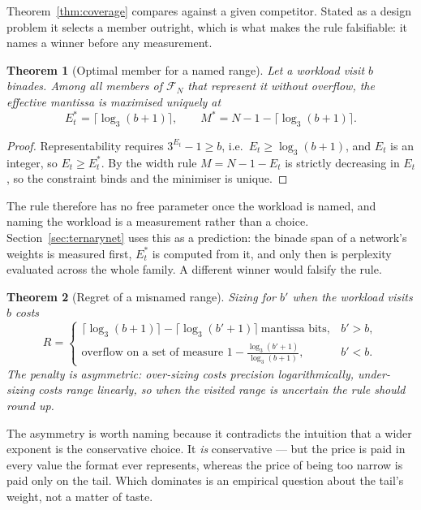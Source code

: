 \documentclass[11pt]{article}
\newtheorem{theorem}{Theorem}
\theoremstyle{definition}
\begin{document}
Theorem~\ref{thm:coverage} compares against a given competitor. Stated as a
design problem it selects a member outright, which is what makes the rule
falsifiable: it names a winner before any measurement.

\begin{theorem}[Optimal member for a named range]
\label{thm:optimal}
Let a workload visit $b$ binades. Among all members of $\mathcal{F}_N$ that
represent it without overflow, the effective mantissa is maximised uniquely at
\[
  E_t^{*} = \bigl\lceil \log_3 (b+1) \bigr\rceil,
  \qquad
  M^{*} = N - 1 - \bigl\lceil \log_3 (b+1) \bigr\rceil .
\]
\end{theorem}
\begin{proof}
Representability requires $3^{E_t}-1 \ge b$, i.e.\ $E_t \ge \log_3(b+1)$, and
$E_t$ is an integer, so $E_t \ge E_t^{*}$. By the width rule $M = N-1-E_t$ is
strictly decreasing in $E_t$, so the constraint binds and the minimiser is unique.
\end{proof}

The rule therefore has no free parameter once the workload is named, and naming
the workload is a measurement rather than a choice. Section~\ref{sec:ternarynet}
uses this as a prediction: the binade span of a network's weights is measured
first, $E_t^{*}$ is computed from it, and only then is perplexity evaluated across
the whole family. A different winner would falsify the rule.

\begin{theorem}[Regret of a misnamed range]
\label{thm:regret}
Sizing for $b'$ when the workload visits $b$ costs
\[
  R =
  \begin{cases}
    \lceil\log_3(b+1)\rceil - \lceil\log_3(b'+1)\rceil \ \text{mantissa bits}, & b' > b,\\[2pt]
    \text{overflow on a set of measure } 1 - \tfrac{\log_3(b'+1)}{\log_3(b+1)}, & b' < b .
  \end{cases}
\]
The penalty is asymmetric: over-sizing costs precision logarithmically, under-sizing
costs range linearly, so when the visited range is uncertain the rule should round up.
\end{theorem}

The asymmetry is worth naming because it contradicts the intuition that a wider
exponent is the conservative choice. It \emph{is} conservative --- but the price is
paid in every value the format ever represents, whereas the price of being too
narrow is paid only on the tail. Which dominates is an empirical question about
the tail's weight, not a matter of taste.
\end{document}
